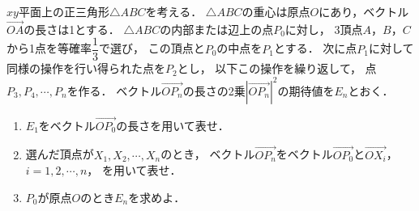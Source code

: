 \documentclass[../../main.tex]{subfiles}
\begin{document}
$xy$平面上の正三角形$\triangle ABC$を考える．
$\triangle ABC$の重心は原点$O$にあり，ベクトル$\overrightarrow{OA}$の長さは1とする．
$\triangle ABC$の内部または辺上の点$P_0$に対し，
3頂点$A$，$B$，$C$から1点を等確率$\displaystyle\dfrac{1}{3}$で選び，
この頂点と$P_0$の中点を$P_1$とする．
次に点$P_1$に対して同様の操作を行い得られた点を$P_2$とし，
以下この操作を繰り返して，
点$P_3,P_4,\cdots,P_n$を作る．
ベクトル$\overrightarrow{OP_n}$の長さの2乗${|\overrightarrow{OP_n}|^2}$の期待値を$E_n$とおく．
\begin{enumerate}
  \item $E_1$をベクトル$\overrightarrow{OP_0}$の長さを用いて表せ．
  \item 選んだ頂点が$X_1,X_2,\cdots,X_n$のとき，
    ベクトル$\overrightarrow{OP_n}$をベクトル$\overrightarrow{OP_0}$と$\overrightarrow{OX_i}$，$i=1,2,\cdots,n$，
    を用いて表せ．
  \item $P_0$が原点$O$のとき$E_n$を求めよ．
\end{enumerate}
\end{document}
